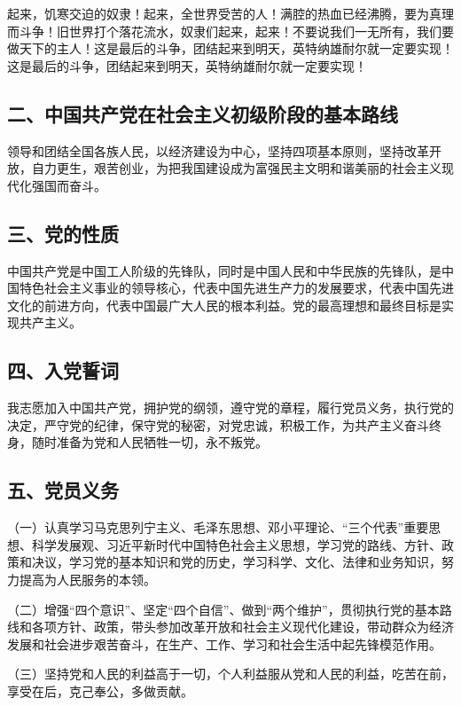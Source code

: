 \documentclass[UTF8,11pt,a4paper]{ctexart}
\begin{document}
起来，饥寒交迫的奴隶！起来，全世界受苦的人！满腔的热血已经沸腾，要为真理而斗争！旧世界打个落花流水，奴隶们起来，起来！不要说我们一无所有，我们要做天下的主人！这是最后的斗争，团结起来到明天，英特纳雄耐尔就一定要实现！这是最后的斗争，团结起来到明天，英特纳雄耐尔就一定要实现！

\subsection*{二、中国共产党在社会主义初级阶段的基本路线}

领导和团结全国各族人民，以经济建设为中心，坚持四项基本原则，坚持改革开放，自力更生，艰苦创业，为把我国建设成为富强民主文明和谐美丽的社会主义现代化强国而奋斗。

\subsection*{三、党的性质}

中国共产党是中国工人阶级的先锋队，同时是中国人民和中华民族的先锋队，是中国特色社会主义事业的领导核心，代表中国先进生产力的发展要求，代表中国先进文化的前进方向，代表中国最广大人民的根本利益。党的最高理想和最终目标是实现共产主义。

\subsection*{四、入党誓词}

我志愿加入中国共产党，拥护党的纲领，遵守党的章程，履行党员义务，执行党的决定，严守党的纪律，保守党的秘密，对党忠诚，积极工作，为共产主义奋斗终身，随时准备为党和人民牺牲一切，永不叛党。

\subsection*{五、党员义务}

\noindent （一）认真学习马克思列宁主义、毛泽东思想、邓小平理论、“三个代表”重要思想、科学发展观、习近平新时代中国特色社会主义思想，学习党的路线、方针、政策和决议，学习党的基本知识和党的历史，学习科学、文化、法律和业务知识，努力提高为人民服务的本领。

\noindent （二）增强“四个意识”、坚定“四个自信”、做到“两个维护”，贯彻执行党的基本路线和各项方针、政策，带头参加改革开放和社会主义现代化建设，带动群众为经济发展和社会进步艰苦奋斗，在生产、工作、学习和社会生活中起先锋模范作用。

\noindent （三）坚持党和人民的利益高于一切，个人利益服从党和人民的利益，吃苦在前，享受在后，克己奉公，多做贡献。
\end{document}
